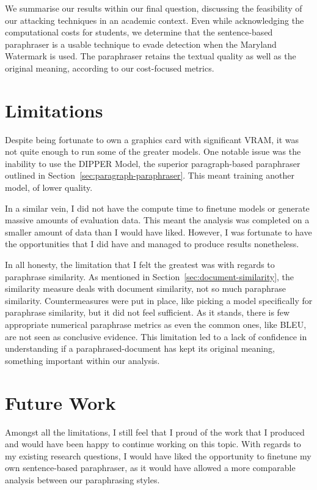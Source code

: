 \documentclass{l4proj}
\theoremstyle{definition}
\begin{document}
We summarise our results within our final question, discussing the feasibility of our attacking techniques in an academic context. Even while acknowledging the computational costs for students, we determine that the sentence-based paraphraser is a usable technique to evade detection when the Maryland Watermark is used. The paraphraser retains the textual quality as well as the original meaning, according to our cost-focused metrics.

\section{Limitations}
    Despite being fortunate to own a graphics card with significant VRAM, it was not quite enough to run some of the greater models. One notable issue was the inability to use the DIPPER Model, the superior paragraph-based paraphraser outlined in Section~\ref{sec:paragraph-paraphraser}. This meant training another model, of lower quality.

    In a similar vein, I did not have the compute time to finetune models or generate massive amounts of evaluation data. This meant the analysis was completed on a smaller amount of data than I would have liked. However, I was fortunate to have the opportunities that I did have and managed to produce results nonetheless.

    In all honesty, the limitation that I felt the greatest was with regards to paraphrase similarity. As mentioned in Section~\ref{sec:document-similarity}, the similarity measure deals with document similarity, not so much paraphrase similarity. Countermeasures were put in place, like picking a model specifically for paraphrase similarity, but it did not feel sufficient. As it stands, there is few appropriate numerical paraphrase metrics as even the common ones, like BLEU, are not seen as conclusive evidence. This limitation led to a lack of confidence in understanding if a paraphrased-document has kept its original meaning, something important within our analysis. 

\section{Future Work}
    Amongst all the limitations, I still feel that I proud of the work that I produced and would have been happy to continue working on this topic. With regards to my existing research questions, I would have liked the opportunity to finetune my own sentence-based paraphraser, as it would have allowed a more comparable analysis between our paraphrasing styles.
\end{document}
